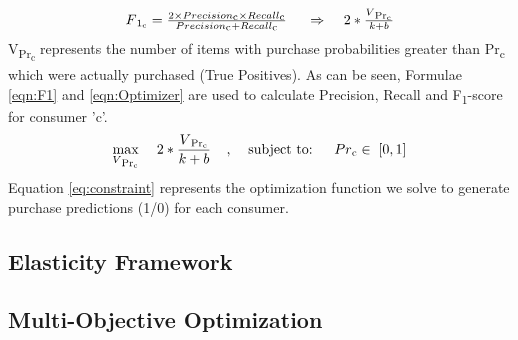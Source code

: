   \begin{equation}
    \begin{array}{l}
      F\textsubscript{1\textsubscript{c}} = \frac{2 \times Precision\textsubscript{c} 
      \times Recall\textsubscript{c}} 
      {Precision\textsubscript{c} + Recall\textsubscript{c}}
      \;
      \;\;\;\;\Rightarrow	\;\;\;\;
      2 * 
      \frac{
        V\textsubscript{Pr\textsubscript{c}}
      }
      {
        k + b
      }
    \end{array}
    \label{eqn:Optimizer}
  \end{equation}
V\textsubscript{Pr\textsubscript{c}} represents the number of items with purchase 
probabilities greater than Pr\textsubscript{c} which were actually purchased (True Positives). 
As can be seen, Formulae \ref{eqn:F1} and \ref{eqn:Optimizer} are used to calculate Precision, Recall and 
F\textsubscript{1}-score for consumer 'c'. 
  \begin{equation}
    \max_{V\textsubscript{Pr\textsubscript{c}}} \;\;\;\; 2 * \frac{ V\textsubscript{Pr\textsubscript{c}}}{k + b}
    \;\;\;\;,\;\;\;\;  \text{subject to: } \;\;\;\;  Pr\textsubscript{c}  \in \; [0,1]
    \label{eq:constraint}
  \end{equation}
Equation \ref{eq:constraint} represents the optimization function we solve to generate purchase predictions (1/0) for each consumer.

\subsection{Elasticity Framework}
\subsection{Multi-Objective Optimization}